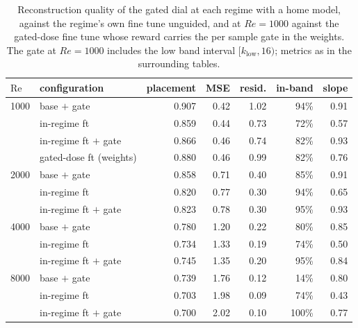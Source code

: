 \begin{table}[H]
  \centering
  \caption{Reconstruction quality of the gated dial at each regime with a home model, against the regime's own fine tune unguided, and at $Re{=}1000$ against the gated-dose fine tune whose reward carries the per sample gate in the weights. The gate at $Re{=}1000$ includes the low band interval $[k_{\mathrm{low}},16)$; metrics as in the surrounding tables.}
  \label{tab:gated-quality}
  \begin{tabular}{llrrrrr}
    \toprule
    $\mathrm{Re}$ & configuration & placement & MSE & resid. & in-band & slope \\
    \midrule
    1000 & base $+$ gate & 0.907 & 0.42 & 1.02 & 94\% & 0.91 \\
     & in-regime ft & 0.859 & 0.44 & 0.73 & 72\% & 0.57 \\
     & in-regime ft $+$ gate & 0.866 & 0.46 & 0.74 & 82\% & 0.93 \\
     & gated-dose ft (weights) & 0.880 & 0.46 & 0.99 & 82\% & 0.76 \\
    \midrule
    2000 & base $+$ gate & 0.858 & 0.71 & 0.40 & 85\% & 0.91 \\
     & in-regime ft & 0.820 & 0.77 & 0.30 & 94\% & 0.65 \\
     & in-regime ft $+$ gate & 0.823 & 0.78 & 0.30 & 95\% & 0.93 \\
    \midrule
    4000 & base $+$ gate & 0.780 & 1.20 & 0.22 & 80\% & 0.85 \\
     & in-regime ft & 0.734 & 1.33 & 0.19 & 74\% & 0.50 \\
     & in-regime ft $+$ gate & 0.745 & 1.35 & 0.20 & 95\% & 0.84 \\
    \midrule
    8000 & base $+$ gate & 0.739 & 1.76 & 0.12 & 14\% & 0.80 \\
     & in-regime ft & 0.703 & 1.98 & 0.09 & 74\% & 0.43 \\
     & in-regime ft $+$ gate & 0.700 & 2.02 & 0.10 & 100\% & 0.77 \\
    \bottomrule
  \end{tabular}
\end{table}
